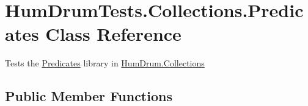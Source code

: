 \hypertarget{classHumDrumTests_1_1Collections_1_1Predicates}{}\section{Hum\+Drum\+Tests.\+Collections.\+Predicates Class Reference}
\label{classHumDrumTests_1_1Collections_1_1Predicates}


Tests the \hyperlink{classHumDrumTests_1_1Collections_1_1Predicates}{Predicates} library in \hyperlink{namespaceHumDrum_1_1Collections}{Hum\+Drum.\+Collections}  


\subsection*{Public Member Functions}
